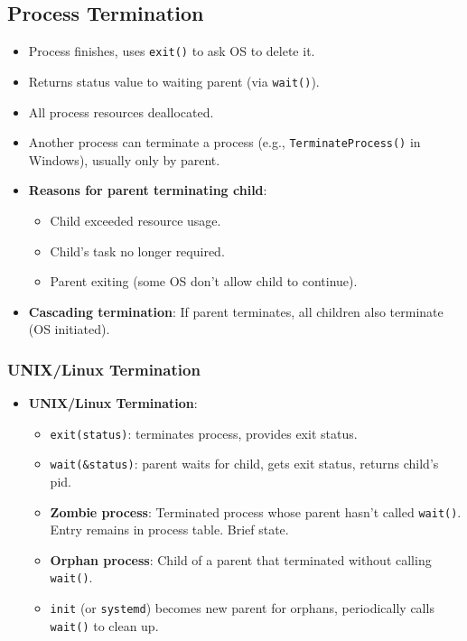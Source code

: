 \subsection{Process Termination}
\begin{itemize}
    \item Process finishes, uses \texttt{exit()} to ask OS to delete it.
    \item Returns status value to waiting parent (via \texttt{wait()}).
    \item All process resources deallocated.
    \item Another process can terminate a process (e.g., \texttt{TerminateProcess()} in Windows), usually only by parent.
    \item \textbf{Reasons for parent terminating child}:
        \begin{itemize}
            \item Child exceeded resource usage.
            \item Child's task no longer required.
            \item Parent exiting (some OS don't allow child to continue).
        \end{itemize}
    \item \textbf{Cascading termination}: If parent terminates, all children also terminate (OS initiated).
\end{itemize}

\subsubsection{UNIX/Linux Termination}
\begin{itemize}
    \item \textbf{UNIX/Linux Termination}:
        \begin{itemize}
            \item \texttt{exit(status)}: terminates process, provides exit status.
            \item \texttt{wait(\&status)}: parent waits for child, gets exit status, returns child's pid.
            \item \textbf{Zombie process}: Terminated process whose parent hasn't called \texttt{wait()}. Entry remains in process table. Brief state.
            \item \textbf{Orphan process}: Child of a parent that terminated without calling \texttt{wait()}.
            \item \texttt{init} (or \texttt{systemd}) becomes new parent for orphans, periodically calls \texttt{wait()} to clean up.
        \end{itemize}
\end{itemize}

